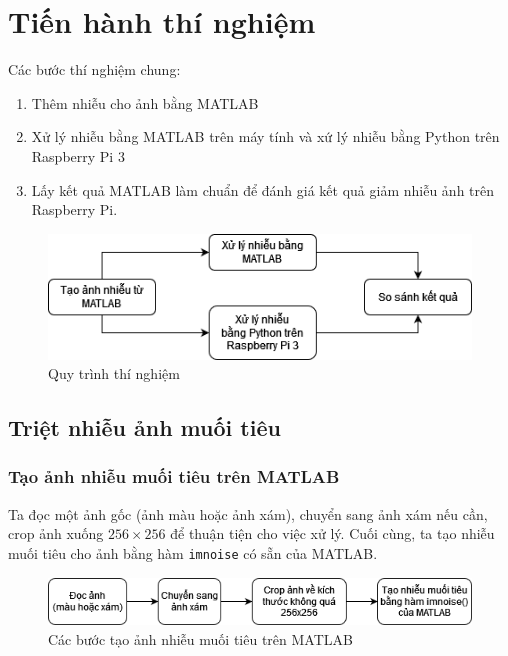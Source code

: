\section{Tiến hành thí nghiệm}

Các bước thí nghiệm chung:

\begin{enumerate}
    \item Thêm nhiễu cho ảnh bằng MATLAB
    \item Xử lý nhiễu bằng MATLAB trên máy tính và xứ lý nhiễu bằng Python trên Raspberry Pi 3
    \item Lấy kết quả MATLAB làm chuẩn để đánh giá kết quả giảm nhiễu ảnh trên Raspberry Pi.
\end{enumerate}

\begin{figure}[H]
    \centering
    \includegraphics[width=.8\linewidth]{images/denoise_flowchart.png}
    \caption{Quy trình thí nghiệm}
    \label{fig:denoise_flowchart}
\end{figure}

\subsection{Triệt nhiễu ảnh muối tiêu}

\subsubsection{Tạo ảnh nhiễu muối tiêu trên MATLAB}

Ta đọc một ảnh gốc (ảnh màu hoặc ảnh xám), chuyển sang ảnh xám nếu cần, crop ảnh xuống $256 \times 256$ để thuận tiện cho việc xử lý. Cuối cùng, ta tạo nhiễu muối tiêu cho ảnh bằng hàm \texttt{imnoise} có sẵn của MATLAB.

\begin{figure}[H]
    \centering
    \includegraphics[width=1\linewidth]{images/salt_pepper_gen_noise.png}
    \caption{Các bước tạo ảnh nhiễu muối tiêu trên MATLAB}
    \label{fig:salt_pepper_gen_noise}
\end{figure}

